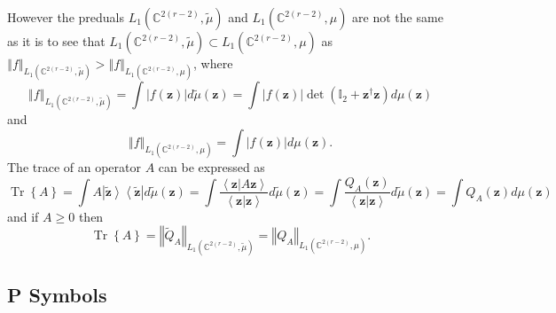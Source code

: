 \documentclass[aps,preprint]{revtex4}%
\begin{document}
However the preduals $L_{1}\left(  \mathbb{C}^{2\left(  r-2\right)  }%
,\tilde{\mu}\right)  $ and $L_{1}\left(  \mathbb{C}^{2\left(  r-2\right)
},\mu\right)  $ are not the same as it is to see that $L_{1}\left(
\mathbb{C}^{2\left(  r-2\right)  },\tilde{\mu}\right)  \subset L_{1}\left(
\mathbb{C}^{2\left(  r-2\right)  },\mu\right)  $ as $\left\Vert f\right\Vert
_{L_{1}\left(  \mathbb{C}^{2\left(  r-2\right)  },\tilde{\mu}\right)
}>\left\Vert f\right\Vert _{L_{1}\left(  \mathbb{C}^{2\left(  r-2\right)
},\mu\right)  }$, where
\begin{equation}
\left\Vert f\right\Vert _{L_{1}\left(  \mathbb{C}^{2\left(  r-2\right)
},\tilde{\mu}\right)  }=\int\left\vert f\left(  \mathbf{z}\right)  \right\vert
d\tilde{\mu}\left(  \mathbf{z}\right)  =\int\left\vert f\left(  \mathbf{z}%
\right)  \right\vert \det\left(  \mathbb{I}_{2}+\mathbf{z}^{\dagger}%
\mathbf{z}\right)  d\mu\left(  \mathbf{z}\right)
\end{equation}
and
\begin{equation}
\left\Vert f\right\Vert _{L_{1}\left(  \mathbb{C}^{2\left(  r-2\right)  }%
,\mu\right)  }=\int\left\vert f\left(  \mathbf{z}\right)  \right\vert
d\mu\left(  \mathbf{z}\right)  .
\end{equation}
The trace of an operator $A$ can be expressed as
\begin{equation}
\operatorname*{Tr}\left\{  A\right\}  =\int A\left\vert \mathbf{\tilde{z}%
}\right\rangle \left\langle \mathbf{\tilde{z}}\right\vert d\tilde{\mu}\left(
\mathbf{z}\right)  =\int\frac{\left\langle \mathbf{z}\left\vert A\mathbf{z}%
\right.  \right\rangle }{\left\langle \mathbf{z}\left\vert \mathbf{z}\right.
\right\rangle }d\tilde{\mu}\left(  \mathbf{z}\right)  =\int\frac{Q_{A}\left(
\mathbf{z}\right)  }{\left\langle \mathbf{z}\left\vert \mathbf{z}\right.
\right\rangle }d\tilde{\mu}\left(  \mathbf{z}\right)  =\int Q_{A}\left(
\mathbf{z}\right)  d\mu\left(  \mathbf{z}\right)
\end{equation}
and if $A\geq0$ then
\begin{equation}
\operatorname*{Tr}\left\{  A\right\}  =\left\Vert \tilde{Q}_{A}\right\Vert
_{L_{1}\left(  \mathbb{C}^{2\left(  r-2\right)  },\tilde{\mu}\right)
}=\left\Vert Q_{A}\right\Vert _{L_{1}\left(  \mathbb{C}^{2\left(  r-2\right)
},\mu\right)  }.
\end{equation}


\subsection{P Symbols}
\end{document}
